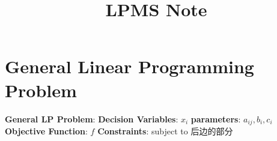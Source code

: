 \documentclass[9pt]{article}
\title{LPMS Note}
\author{}
\date{}
\begin{document}
\maketitle
\thispagestyle{fancy}
\vspace{-3.5cm}

\fontsize{10pt}{11pt}\selectfont
\setlength{\parindent}{8pt}
\setlength{\abovedisplayskip}{0pt}
\setlength{\belowdisplayskip}{0pt}


\section{General Linear Programming Problem} %

\textbf{General LP Problem}: {\small \textbf{Decision Variables}: $x_i$ \quad \textbf{parameters}: $a_{ij},b_i,c_i$ \quad \textbf{Objective Function}: $f$ \quad \textbf{Constraints}: {\small subject to 后边的部分}}
\end{document}
